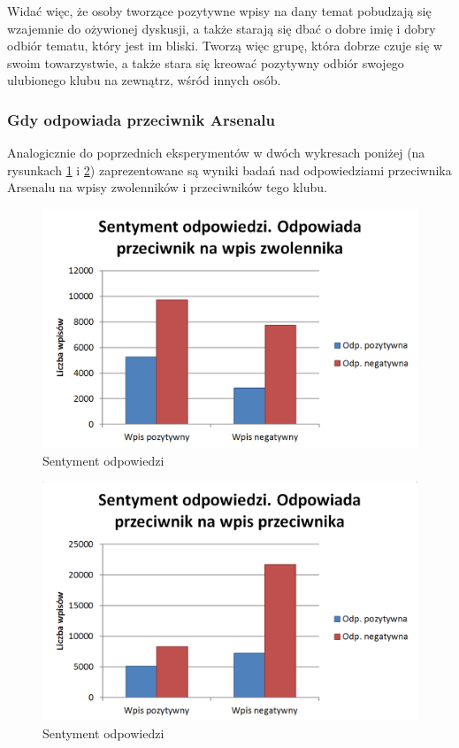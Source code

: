 Widać więc, że osoby tworzące pozytywne wpisy na dany temat pobudzają się
wzajemnie do ożywionej dyskusji, a także starają się dbać o dobre imię
i dobry odbiór tematu, który jest im bliski. Tworzą więc grupę, która
dobrze czuje się w swoim towarzystwie, a także stara się kreować
pozytywny odbiór swojego ulubionego klubu na zewnątrz, wśród innych osób.

\clearpage
\subsubsection{Gdy odpowiada przeciwnik Arsenalu}
Analogicznie do poprzednich eksperymentów w dwóch wykresach poniżej (na 
rysunkach \ref{image:reply-sentiment-przeciwnik-zwolennik} i 
\ref{image:reply-sentiment-przeciwnik-przeciwnik}) zaprezentowane są
wyniki badań nad odpowiedziami przeciwnika Arsenalu na wpisy zwolenników
i przeciwników tego klubu.

\begin{figure}[ht!] \centering
\includegraphics[width=140mm]{img/reply-sentiment-przeciwnik-zwolennik.png}
\caption{Sentyment odpowiedzi}
\label{image:reply-sentiment-przeciwnik-zwolennik}
\end{figure}

\begin{figure}[ht!] \centering
\includegraphics[width=140mm]{img/reply-sentiment-przeciwnik-przeciwnik.png}
\caption{Sentyment odpowiedzi}
\label{image:reply-sentiment-przeciwnik-przeciwnik}
\end{figure}

